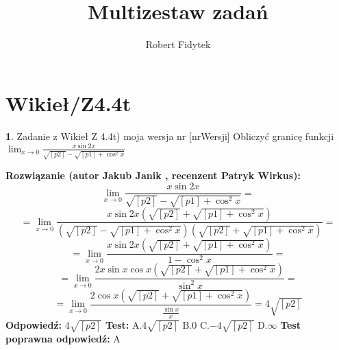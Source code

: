 \documentclass[12pt, a4paper]{article}
\title{Multizestaw zadań}
\author{Robert Fidytek}
\date{}
\theoremstyle{definition} %
\newtheorem{zad}{}
\newcommand{\kategoria}[1]{\section{#1}} %
\newcommand{\zadStart}[1]{\begin{zad}#1\newline} %
\newcommand{\zadStop}{\end{zad}}   %
\newcommand{\rozwStart}[2]{\noindent \textbf{Rozwiązanie (autor #1 , recenzent #2): }\newline} %
\newcommand{\rozwStop}{\newline}                                            %
\newcommand{\odpStart}{\noindent \textbf{Odpowiedź:}\newline}    %
\newcommand{\odpStop}{\newline}                                             %
\newcommand{\testStart}{\noindent \textbf{Test:}\newline} %
\newcommand{\testStop}{\newline} %
\newcommand{\kluczStart}{\noindent \textbf{Test poprawna odpowiedź:}\newline} %
\newcommand{\kluczStop}{\newline} %
\begin{document}
\maketitle


\kategoria{Wikieł/Z4.4t}
\zadStart{Zadanie z Wikieł Z 4.4t) moja wersja nr [nrWersji]}
Obliczyć granicę funkcji $\lim_{x \to 0} \frac{x\sin{2x}}{\sqrt{[p2]}-\sqrt{[p1]+\cos^2{x}}}$
\zadStop
\rozwStart{Jakub Janik}{Patryk Wirkus}
$$\lim_{x \to 0} \frac{x\sin{2x}}{\sqrt{[p2]}-\sqrt{[p1]+\cos^2{x}}}=$$
$$=\lim_{x \to 0} \frac{x\sin{2x}(\sqrt{[p2]}+\sqrt{[p1]+\cos^2{x}})}{(\sqrt{[p2]}-\sqrt{[p1]+\cos^2{x}})(\sqrt{[p2]}+\sqrt{[p1]+\cos^2{x}})}=$$
$$=\lim_{x \to 0} \frac{x\sin{2x}(\sqrt{[p2]}+\sqrt{[p1]+\cos^2{x}})}{1-\cos^2{x}}=$$
$$=\lim_{x \to 0} \frac{2x\sin{x}\cos{x}(\sqrt{[p2]}+\sqrt{[p1]+\cos^2{x}})}{\sin^2{x}}=$$
$$=\lim_{x \to 0} \frac{2\cos{x}(\sqrt{[p2]}+\sqrt{[p1]+\cos^2{x}})}{\frac{\sin{x}}{x}}=4\sqrt{[p2]}$$
\rozwStop
\odpStart
$4\sqrt{[p2]}$
\odpStop
\testStart
A.$4\sqrt{[p2]}$
B.$0$
C.$-4\sqrt{[p2]}$
D.$\infty$
\testStop
\kluczStart
A
\kluczStop
\end{document}
